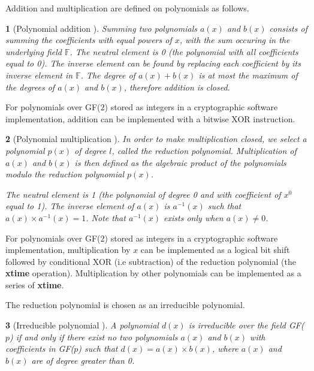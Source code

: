 \documentclass{report}
\newtheorem*{concept}{}{\bfseries}{\itshape}
\begin{document}
Addition and multiplication are defined on polynomials as follows.

\begin{concept}[Polynomial addition \cite{DesignOfRijndael2002}]
Summing two polynomials $a(x)$ and $b(x)$ consists of summing the coefficients with equal powers of $x$, with the sum occuring in the underlying field $\mathbb{F}$. The neutral element is 0 (the polynomial with all coefficients equal to 0). The inverse element can be found by replacing each coefficient by its inverse element in $\mathbb{F}$. The degree of $a(x) + b(x)$ is at most the maximum of the degrees of $a(x)$ and $b(x)$, therefore addition is closed.
\end{concept}

For polynomials over GF($2$) stored as integers in a cryptographic software implementation, addition can be implemented with a bitwise XOR instruction.

\begin{concept}[Polynomial multiplication \cite{DesignOfRijndael2002}]
In order to make multiplication closed, we select a polynomial $p(x)$ of degree $l$, called the \emph{reduction polynomial}. Multiplication of $a(x)$ and $b(x)$ is then defined as the algebraic product of the polynomials modulo the reduction polynomial $p(x)$.

The neutral element is 1 (the polynomial of degree 0 and with coefficient of $x^0$ equal to 1). The inverse element of $a(x)$ is $a^{-1}(x)$ such that $a(x) \times a^{-1}(x) = 1$. Note that $a^{-1}(x)$ exists only when $a(x) \neq 0$.
\end{concept}

For polynomials over GF($2$) stored as integers in a cryptographic software implementation, multiplication by $x$ can be implemented as a logical bit shift followed by conditional XOR (i.e subtraction) of the reduction polynomial (the \textbf{xtime} operation). Multiplication by other polynomials can be implemented as a series of \textbf{xtime}.

The reduction polynomial is chosen as an irreducible polynomial.

\begin{concept}[Irreducible polynomial \cite{DesignOfRijndael2002}]
A polynomial $d(x)$ is irreducible over the field GF($p$) if and only if there exist no two polynomials $a(x)$ and $b(x)$ with coefficients in GF($p$) such that $d(x) = a(x) \times b(x)$, where $a(x)$ and $b(x)$ are of degree greater than 0.
\end{concept}
\end{document}
